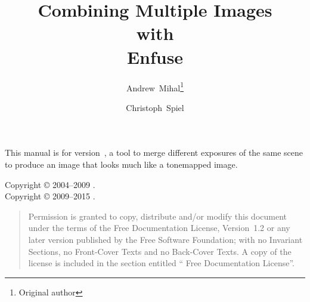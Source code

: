 

\begin{titlepage}
  \renewcommand{\thefootnote}{\fnsymbol{footnote}}

  \author{Andrew~Mihal\footnote{Original author} \and Christoph~Spiel}

  \title{Combining Multiple Images\\ with\\ Enfuse }

  \date{}

  \maketitle
\end{titlepage}


\vspace*{\fill}
\ifhevea
  \relax
\else
  \begin{center}\end{center}
\fi

\label{sec:abstract}\noindent This manual is for \App{}
version~, a tool to merge different exposures of the same scene to produce an
image that looks much like a tonemapped image.

\vspace*{\fill}

\begin{flushleft}
  Copyright \copyright{} 2004--2009 . \\
  Copyright \copyright{} 2009--2015 .
\end{flushleft}

\begin{quotation}
  \noindent Permission is granted to copy, distribute and/or modify this document under the
  terms of the  Free Documentation License, Version~1.2 or any later version
  published by the Free Software Foundation; with no Invariant Sections, no Front-Cover Texts
  and no Back-Cover Texts.  A copy of the license is included in the section entitled
  `` Free Documentation License''.
\end{quotation}

\cleardoublepage{}


